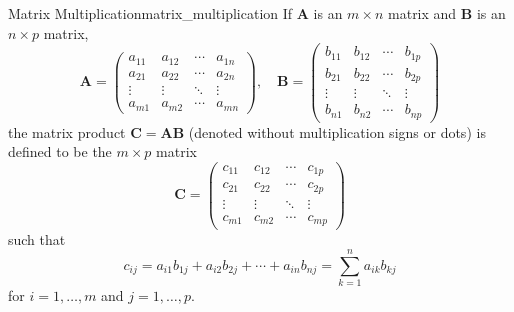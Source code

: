 \begin{definition}{Matrix Multiplication}{matrix_multiplication}
    If $\mathbf{A}$ is an $m \times n$ matrix and $\mathbf{B}$ is an $n \times p$ matrix,
    \[
    \mathbf{A}=\left(\begin{array}{cccc}
        a_{11} & a_{12} & \cdots & a_{1 n} \\
        a_{21} & a_{22} & \cdots & a_{2 n} \\
        \vdots & \vdots & \ddots & \vdots \\
        a_{m 1} & a_{m 2} & \cdots & a_{m n}
        \end{array}\right), \quad \mathbf{B}=\left(\begin{array}{cccc}
        b_{11} & b_{12} & \cdots & b_{1 p} \\
        b_{21} & b_{22} & \cdots & b_{2 p} \\
        \vdots & \vdots & \ddots & \vdots \\
        b_{n 1} & b_{n 2} & \cdots & b_{n p}
    \end{array}\right)
    \]
    the matrix product $\mathbf{C}=\mathbf{A B}$ (denoted without multiplication signs or dots) is defined to be the $m \times p$ matrix 
    \[
    \mathbf{C}=\left(\begin{array}{cccc}
    c_{11} & c_{12} & \cdots & c_{1 p} \\
    c_{21} & c_{22} & \cdots & c_{2 p} \\
    \vdots & \vdots & \ddots & \vdots \\
    c_{m 1} & c_{m 2} & \cdots & c_{m p}
    \end{array}\right)
    \]
    such that
    \[
    c_{i j}=a_{i 1} b_{1 j}+a_{i 2} b_{2 j}+\cdots+a_{i n} b_{n j}=\sum_{k=1}^{n} a_{i k} b_{k j}
    \]
    for $i=1, \ldots, m$ and $j=1, \ldots, p$.
\end{definition}
